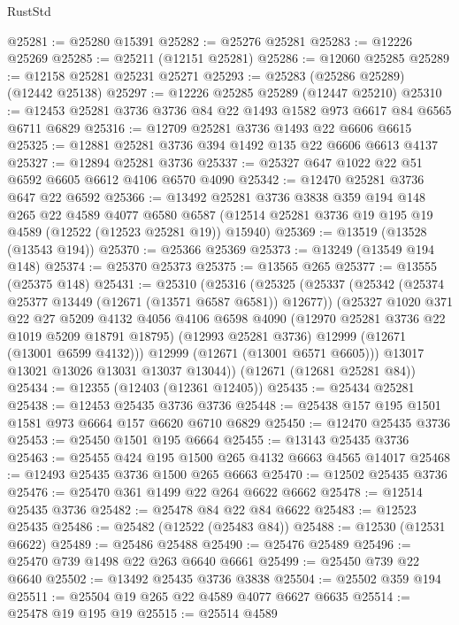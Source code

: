\begin{lexlean}{RustStd}
\begin{coremodule}
@25281 := @25280 @15391
@25282 := @25276 @25281
@25283 := @12226 @25269
@25285 := @25211 (@12151 @25281)
@25286 := @12060 @25285
@25289 := @12158 @25281 @25231 @25271
@25293 := @25283 (@25286 @25289) (@12442 @25138)
@25297 := @12226 @25285 @25289 (@12447 @25210)
@25310 := @12453 @25281 @3736 @3736 @84 @22 @1493 @1582 @973 @6617 @84 @6565 @6711 @6829
@25316 := @12709 @25281 @3736 @1493 @22 @6606 @6615
@25325 := @12881 @25281 @3736 @394 @1492 @135 @22 @6606 @6613 @4137
@25327 := @12894 @25281 @3736
@25337 := @25327 @647 @1022 @22 @51 @6592 @6605 @6612 @4106 @6570 @4090
@25342 := @12470 @25281 @3736 @647 @22 @6592
@25366 := @13492
    @25281
    @3736
    @3838
    @359
    @194
    @148
    @265
    @22
    @4589
    @4077
    @6580
    @6587
    (@12514 @25281 @3736 @19 @195 @19 @4589 (@12522 (@12523 @25281 @19)) @15940)
@25369 := @13519 (@13528 (@13543 @194))
@25370 := @25366 @25369
@25373 := @13249 (@13549 @194 @148)
@25374 := @25370 @25373
@25375 := @13565 @265
@25377 := @13555 (@25375 @148)
@25431 := @25310
    (@25316
      (@25325
        (@25337
          (@25342 (@25374 @25377 @13449 (@12671 (@13571 @6587 @6581)) @12677))
          (@25327
            @1020
            @371
            @22
            @27
            @5209
            @4132
            @4056
            @4106
            @6598
            @4090
            (@12970 @25281 @3736 @22 @1019 @5209 @18791 @18795)
            (@12993 @25281 @3736)
            @12999
            (@12671 (@13001 @6599 @4132)))
          @12999
          (@12671 (@13001 @6571 @6605)))
        @13017
        @13021
        @13026
        @13031
        @13037
        @13044))
    (@12671 (@12681 @25281 @84))
@25434 := @12355 (@12403 (@12361 @12405))
@25435 := @25434 @25281
@25438 := @12453 @25435 @3736 @3736
@25448 := @25438 @157 @195 @1501 @1581 @973 @6664 @157 @6620 @6710 @6829
@25450 := @12470 @25435 @3736
@25453 := @25450 @1501 @195 @6664
@25455 := @13143 @25435 @3736
@25463 := @25455 @424 @195 @1500 @265 @4132 @6663 @4565 @14017
@25468 := @12493 @25435 @3736 @1500 @265 @6663
@25470 := @12502 @25435 @3736
@25476 := @25470 @361 @1499 @22 @264 @6622 @6662
@25478 := @12514 @25435 @3736
@25482 := @25478 @84 @22 @84 @6622
@25483 := @12523 @25435
@25486 := @25482 (@12522 (@25483 @84))
@25488 := @12530 (@12531 @6622)
@25489 := @25486 @25488
@25490 := @25476 @25489
@25496 := @25470 @739 @1498 @22 @263 @6640 @6661
@25499 := @25450 @739 @22 @6640
@25502 := @13492 @25435 @3736 @3838
@25504 := @25502 @359 @194
@25511 := @25504 @19 @265 @22 @4589 @4077 @6627 @6635
@25514 := @25478 @19 @195 @19
@25515 := @25514 @4589

\end{coremodule}
\end{lexlean}
